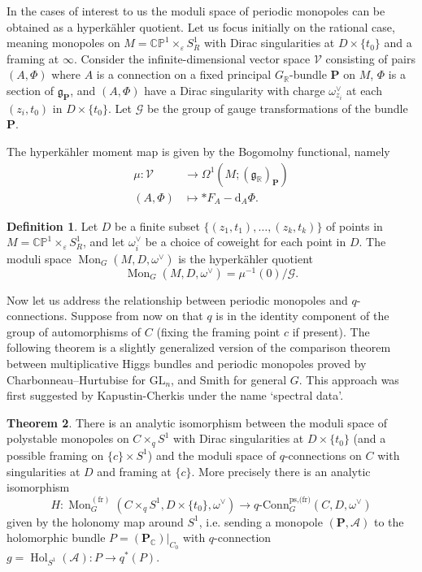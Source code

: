 \documentclass[11pt, oneside, reqno]{amsart}
\theoremstyle{definition} \newtheorem{definition}{Definition}[section]
\newtheorem{theorem}[definition]{Theorem}
\theoremstyle{definition} \newtheorem{remark}[definition]{Remark}
\theoremstyle{definition} \newtheorem{remarks}[definition]{Remarks}
\theoremstyle{definition} \newtheorem{question}[definition]{Question}
\theoremstyle{definition} \newtheorem*{note}{Note}
\theoremstyle{definition} \newtheorem{example}[definition]{Example}
\theoremstyle{definition} \newtheorem{examples}[definition]{Examples}
\renewcommand{\gg}{\mathfrak{g}}
\newcommand{\bb}[1]{\mathbb{#1}}
\newcommand{\mc}[1]{\mathcal{#1}}
\newcommand{\bo}[1]{\boldsymbol{#1}}
\newcommand{\CC}{\mathbb{C}}
\newcommand{\RR}{\mathbb{R}}
\newcommand{\eps}{\varepsilon}
\newcommand{\GL}{\mathrm{GL}}
\DeclareMathOperator{\mon}{Mon}
\DeclareMathOperator{\Hol}{Hol}
\newcommand{\qconn}{q\text{-Conn}}
\renewcommand{\d}{\mathrm{d}}
\newcommand{\fr}{\mathrm{fr}}
\begin{document}
In the cases of interest to us the moduli space of periodic monopoles can be obtained as a hyperk\"ahler quotient.  Let us focus initially on the rational case, meaning monopoles on $M = \bb{CP}^1 \times_\eps S^1_R$ with Dirac singularities at $D \times \{t_0\}$ and a framing at $\infty$.  Consider the infinite-dimensional vector space $\mc V$ consisting of pairs $(A,\Phi)$ where $A$ is a connection on a fixed principal $G_\RR$-bundle $\bo P$ on $M$, $\Phi$ is a section of $\gg_{\bo P}$, and $(A,\Phi)$ have a Dirac singularity with charge $\omega^\vee_{z_i}$ at each $(z_i,t_0)$ in $D \times \{t_0\}$.  Let $\mc G$ be the group of gauge transformations of the bundle $\bo P$.

The hyperk\"ahler moment map is given by the Bogomolny functional, namely
\begin{align*}
\mu \colon \mc V &\to \Omega^1(M; (\gg_\RR)_{\bo P}) \\
(A,\Phi) &\mapsto \ast F_A - \d_A \Phi.
\end{align*}

\begin{definition} \label{monopole_moduli_def}
Let $D$ be a finite subset $\{(z_1,t_1), \ldots, (z_k, t_k)\}$ of points in $M = \bb{CP}^1 \times_\eps S^1_R$, and let $\omega^\vee_{i}$ be a choice of coweight for each point in $D$. The moduli space $\mon_G(M, D, \omega^\vee)$ is the hyperk\"ahler quotient
\[\mon_G(M, D, \omega^\vee) = \mu^{-1}(0) / \mc G.\]
\end{definition}

Now let us address the relationship between periodic monopoles and
$q$-connections.  Suppose from now on that $q$ is in the identity
component of the group of automorphisms of $C$ (fixing the framing
point $c$ if present).  The following theorem is a slightly
generalized version of the comparison theorem between multiplicative
Higgs bundles and periodic monopoles proved by Charbonneau--Hurtubise
\cite{CharbonneauHurtubise} for $\GL_n$, and Smith \cite{Smith} for
general $G$. This approach was first suggested by Kapustin-Cherkis
\cite{CherkisKapustin2} under the name `spectral data'. 

\begin{theorem} \label{monopole_qconn_comparison_thm}
There is an analytic isomorphism between the moduli space of polystable monopoles on $C \times_q S^1$ with Dirac singularities at $D \times \{t_0\}$ (and a possible framing on $\{c\} \times S^1$) and the moduli space of $q$-connections on $C$ with singularities at $D$ and framing at $\{c\}$.  More precisely there is an analytic isomorphism
\[H \colon \mon^{(\fr)}_G(C \times_q S^1, D \times \{t_0\}, \omega^\vee) \to \qconn_G^{\text{ps,(fr)}}(C, D, \omega^\vee)\]
given by the holonomy map around $S^1$, i.e. sending a monopole $(\bo P, \mc A)$ to the holomorphic bundle $P = (\bo P_\CC)|_{C_0}$ with $q$-connection $g = \Hol_{S^1}(\mc A) \colon P \to q^*(P)$.
\end{theorem}
\end{document}
